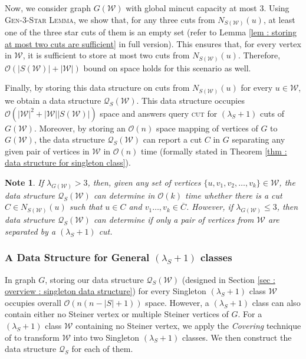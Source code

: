 \documentclass[letterpaper,11pt]{article}
\newtheorem{note}{Note}[]
\begin{document}
Now, we consider graph $G({\mathcal W})$ with global mincut capacity at most $3$. Using \textsc{Gen-3-Star Lemma}, we show that, for any three cuts from $N_{S({\mathcal W})}(u)$, at least one of the three star cuts of them is an empty set (refer to Lemma \ref{lem : storing at most two cuts are sufficient} in full version). This ensures that, for every vertex in ${\mathcal W}$, it is sufficient to store at most two cuts from $N_{S({\mathcal W})}(u)$. Therefore, ${\mathcal O}(|S({\mathcal W})|+|{\mathcal W}|)$ bound on space holds for this scenario as well.  

Finally, by storing this data structure on cuts from $N_{S({\mathcal W})}(u)$ for every $u\in {\mathcal W}$, we obtain a data structure ${\mathcal Q}_S({\mathcal W})$. This data structure occupies ${\mathcal O}(|{\mathcal W}|^2+|{\mathcal W}||S({\mathcal W})|)$ space and
answers query \textsc{cut} for $(\lambda_S+1)$ cuts of $G({\mathcal W})$.
Moreover, by storing an ${\mathcal O}(n)$ space mapping of vertices of $G$ to $G({\mathcal W})$, the data structure ${\mathcal Q}_S({\mathcal W})$ can report a cut $C$ in $G$ separating any given pair of vertices in ${\mathcal W}$ in ${\mathcal O}(n)$ time (formally stated in Theorem \ref{thm : data structure for singleton class}).
\begin{note} \label{note : k vertices}
    If $\lambda_{G({\mathcal W})}> 3$, then, given any set of vertices $\{u,v_1,v_2,\ldots, v_k\}\in {\mathcal W}$, the data structure ${\mathcal Q}_S({\mathcal W})$ can determine in ${\mathcal O}(k)$ time whether there is a cut $C\in N_{S({\mathcal W})}(u)$ such that $u\in C$ and $v_1\ldots,v_k\in \overline{C}$. However, if $\lambda_{G({\mathcal W})}\le 3$, then data structure ${\mathcal Q}_S({\mathcal W})$ can determine if only a pair of vertices from ${\mathcal W}$ are separated by a $(\lambda_S+1)$ cut.
\end{note}










\subsubsection{A Data Structure for General $(\lambda_S+1)$ classes}
In graph $G$, storing our data structure ${\mathcal Q}_S({\mathcal W})$ (designed in Section \ref{sec : overview : singleton data structure}) for every Singleton $(\lambda_S+1)$ class ${\mathcal W}$ occupies overall ${\mathcal O}(n(n-|S|+1))$ space.
However, a $(\lambda_S+1)$ class can also contain either no Steiner vertex or multiple Steiner vertices of $G$. For a $(\lambda_S+1)$ class ${\mathcal W}$ containing no Steiner vertex, we apply the \textit{Covering} technique of  \cite{DBLP:journals/talg/BaswanaBP23} to transform ${\mathcal W}$ into two Singleton $(\lambda_S+1)$ classes. We then construct the data structure ${\mathcal Q}_S$ for each of them. 
\end{document}
